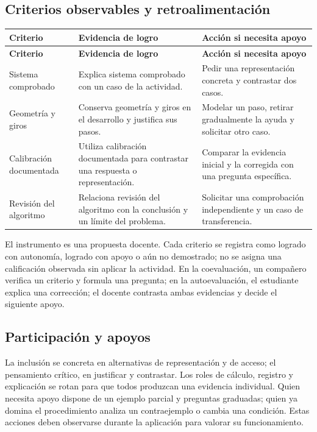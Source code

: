\documentclass[spanish,letterpaper,oneside]{article}
\begin{document}
\subsection{Criterios observables y retroalimentación}

{\small{}\renewcommand{\arraystretch}{1.25}
\begin{longtable}{|>{\raggedright\arraybackslash}p{}|>{\raggedright\arraybackslash}p{}|>{\raggedright\arraybackslash}p{}|}\hline
\rowcolor{iiiepePale} \textbf{Criterio} & \textbf{Evidencia de logro} & \textbf{Acción si necesita apoyo} \\\hline
\endfirsthead
\hline
\rowcolor{iiiepePale} \textbf{Criterio} & \textbf{Evidencia de logro} & \textbf{Acción si necesita apoyo} \\\hline
\endhead
Sistema comprobado & Explica sistema comprobado con un caso de la actividad. & Pedir una representación concreta y contrastar dos casos. \\\hline
Geometría y giros & Conserva geometría y giros en el desarrollo y justifica sus pasos. & Modelar un paso, retirar gradualmente la ayuda y solicitar otro caso. \\\hline
Calibración documentada & Utiliza calibración documentada para contrastar una respuesta o representación. & Comparar la evidencia inicial y la corregida con una pregunta específica. \\\hline
Revisión del algoritmo & Relaciona revisión del algoritmo con la conclusión y un límite del problema. & Solicitar una comprobación independiente y un caso de transferencia. \\\hline
\end{longtable}}
El instrumento es una propuesta docente. Cada criterio se registra como logrado con autonomía, logrado con apoyo o aún no demostrado; no se asigna una calificación observada sin aplicar la actividad. En la coevaluación, un compañero verifica un criterio y formula una pregunta; en la autoevaluación, el estudiante explica una corrección; el docente contrasta ambas evidencias y decide el siguiente apoyo.\subsection{Participación y apoyos}
La inclusión se concreta en alternativas de representación y de acceso; el pensamiento crítico, en justificar y contrastar. Los roles de cálculo, registro y explicación se rotan para que todos produzcan una evidencia individual. Quien necesita apoyo dispone de un ejemplo parcial y preguntas graduadas; quien ya domina el procedimiento analiza un contraejemplo o cambia una condición. Estas acciones deben observarse durante la aplicación para valorar su funcionamiento.
\end{document}
